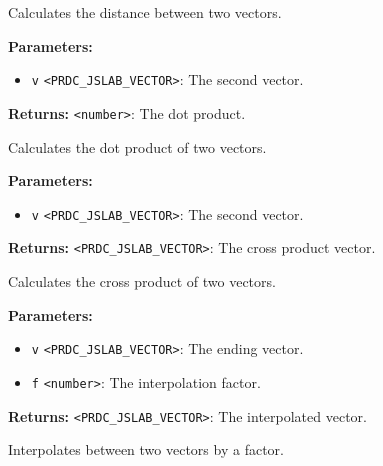 \documentclass[12pt,a4paper]{article}
\begin{document}
\noindent Calculates the distance between two vectors.

\vspace{5mm}
\noindent {}


\noindent \textbf{Parameters:}
\begin{itemize}
  \item \texttt{v} \texttt{<PRDC\_JSLAB\_VECTOR>}: The second vector.
\end{itemize}

\noindent \textbf{Returns:} \texttt{<number>}: The dot product.

\noindent Calculates the dot product of two vectors.

\vspace{5mm}
\noindent {}


\noindent \textbf{Parameters:}
\begin{itemize}
  \item \texttt{v} \texttt{<PRDC\_JSLAB\_VECTOR>}: The second vector.
\end{itemize}

\noindent \textbf{Returns:} \texttt{<PRDC\_JSLAB\_VECTOR>}: The cross product vector.

\noindent Calculates the cross product of two vectors.

\vspace{5mm}
\noindent {}


\noindent \textbf{Parameters:}
\begin{itemize}
  \item \texttt{v} \texttt{<PRDC\_JSLAB\_VECTOR>}: The ending vector.
  \item \texttt{f} \texttt{<number>}: The interpolation factor.
\end{itemize}

\noindent \textbf{Returns:} \texttt{<PRDC\_JSLAB\_VECTOR>}: The interpolated vector.

\noindent Interpolates between two vectors by a factor.

\vspace{5mm}
\noindent {}
\end{document}
